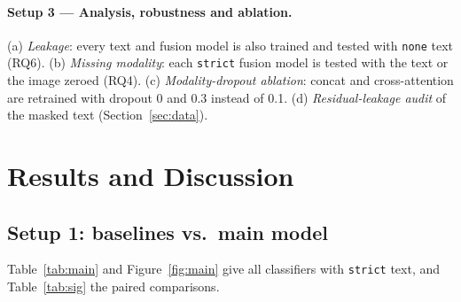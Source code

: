 \documentclass[11pt,a4paper]{article}
\begin{document}
\paragraph{Setup 3 --- Analysis, robustness and ablation.}
(a) \emph{Leakage}: every text and fusion model is also trained and tested with \texttt{none} text (RQ6).
(b) \emph{Missing modality}: each \texttt{strict} fusion model is tested with the text or the image zeroed (RQ4).
(c) \emph{Modality-dropout ablation}: concat and cross-attention are retrained with dropout 0 and 0.3 instead of 0.1.
(d) \emph{Residual-leakage audit} of the masked text (Section~\ref{sec:data}).

\section{Results and Discussion}

\subsection{Setup 1: baselines vs.\ main model}

Table~\ref{tab:main} and Figure~\ref{fig:main} give all classifiers with \texttt{strict} text, and
Table~\ref{tab:sig} the paired comparisons.
\end{document}
